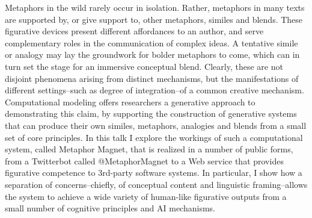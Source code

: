 \documentclass[10pt,letterpaper]{article}
\begin{document}
Metaphors in the wild rarely occur in isolation. Rather, metaphors in many texts are supported by, or give support to, other metaphors, similes and blends.  These figurative devices present different affordances to an author, and serve complementary roles in the communication of complex ideas. A tentative simile or analogy may lay the groundwork for bolder metaphors to come, which can in turn set the stage for an immersive conceptual blend. Clearly, these are not disjoint phenomena arising from distinct mechanisms, but the manifestations of different settings--such as degree of integration--of a common creative mechanism. Computational modeling offers researchers a generative approach to demonstrating this claim, by supporting the construction of generative systems that can produce their own similes, metaphors, analogies and blends from a small set of core principles. In this talk I explore the workings of such a computational system, called Metaphor Magnet, that is realized in a number of public forms, from a Twitterbot called @MetaphorMagnet to a Web service that provides figurative competence to 3rd-party software systems. In particular, I show how a separation of concerns--chiefly, of conceptual content and linguistic framing--allows the system to achieve a wide variety of human-like figurative outputs from a small number of cognitive principles and AI mechanisms.




\setlength{\bibleftmargin}{.125in}
\setlength{\bibindent}{-\bibleftmargin}


\end{document}
